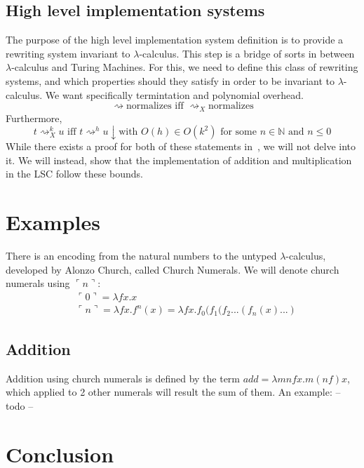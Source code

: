 \documentclass[11pt]{article}
\begin{document}
\subsection{High level implementation systems}
The purpose of the high level implementation system definition is to provide a rewriting system invariant to $\lambda$-calculus. This step is a bridge of sorts in between $\lambda$-calculus and Turing Machines. For this, we need to define this class of rewriting systems, and which properties should they satisfy in order to be invariant to $\lambda$-calculus. We want specifically termintation and polynomial overhead.
\[\rightsquigarrow \text{normalizes iff } {\rightsquigarrow}_{X} \text{normalizes}\]
Furthermore,
\[t {\rightsquigarrow}_{X}^k u \text{ iff } t {\rightsquigarrow}^h u\downarrow \text{with } O(h) \in O(k^2) \text{ for some } n \in \mathbb{N} \text{ and } n \leq 0 \]
While there exists a proof for both of these statements in~\cite{beta-invariance}, we will not delve into it. We will instead, show that the implementation of addition and multiplication in the LSC follow these bounds.
\section{Examples}
There is an encoding from the natural numbers to the untyped $\lambda$-calculus, developed by Alonzo Church, called Church Numerals. We will denote church numerals using $\ulcorner n \urcorner$:
\begin{equation}
	\begin{split}
		& \ulcorner 0 \urcorner = \lambda f x . x \\
		& \ulcorner n \urcorner = \lambda f x . f^n (x) = \lambda f x . f_0 ( f_1 ( f_2 ... ( f_n ( x ) ... )
	\end{split}
\end{equation}

\subsection{Addition}
Addition using church numerals is defined by the term $\textit{add} = \lambda mnfx.m(n f ) x$, which applied to 2 other numerals will result the sum of them. An example:
-- todo --
\section{Conclusion}
\printbibliography{}
\end{document}
